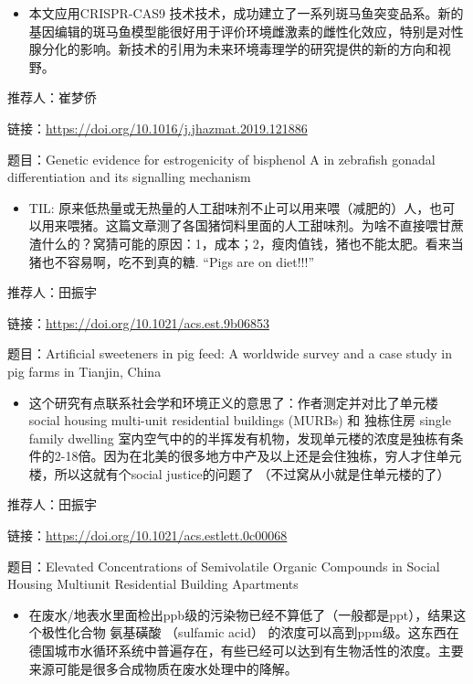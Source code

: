 \documentclass[]{book}
\providecommand{\tightlist}{%
  \setlength{\itemsep}{0pt}\setlength{\parskip}{0pt}}
\begin{document}
\begin{itemize}
\tightlist
\item
  本文应用CRISPR-CAS9 技术技术，成功建立了一系列斑马鱼突变品系。新的基因编辑的斑马鱼模型能很好用于评价环境雌激素的雌性化效应，特别是对性腺分化的影响。新技术的引用为未来环境毒理学的研究提供的新的方向和视野。
\end{itemize}

推荐人：崔梦侨

链接：\url{https://doi.org/10.1016/j.jhazmat.2019.121886}

题目：Genetic evidence for estrogenicity of bisphenol A in zebrafish gonadal differentiation and its signalling mechanism

\begin{itemize}
\tightlist
\item
  TIL: 原来低热量或无热量的人工甜味剂不止可以用来喂（减肥的）人，也可以用来喂猪。这篇文章测了各国猪饲料里面的人工甜味剂。为啥不直接喂甘蔗渣什么的？窝猜可能的原因：1，成本；2，瘦肉值钱，猪也不能太肥。看来当猪也不容易啊，吃不到真的糖. ``Pigs are on diet!!!''
\end{itemize}

推荐人：田振宇

链接：\url{https://doi.org/10.1021/acs.est.9b06853}

题目：Artificial sweeteners in pig feed: A worldwide survey and a case study in pig farms in Tianjin, China

\begin{itemize}
\tightlist
\item
  这个研究有点联系社会学和环境正义的意思了：作者测定并对比了单元楼 social housing multi-unit residential buildings (MURBs) 和 独栋住房 single family dwelling 室内空气中的的半挥发有机物，发现单元楼的浓度是独栋有条件的2-18倍。因为在北美的很多地方中产及以上还是会住独栋，穷人才住单元楼，所以这就有个social justice的问题了 （不过窝从小就是住单元楼的了）
\end{itemize}

推荐人：田振宇

链接：\url{https://doi.org/10.1021/acs.estlett.0c00068}

题目：Elevated Concentrations of Semivolatile Organic Compounds in Social Housing Multiunit Residential Building Apartments

\begin{itemize}
\tightlist
\item
  在废水/地表水里面检出ppb级的污染物已经不算低了（一般都是ppt），结果这个极性化合物 氨基磺酸 （sulfamic acid） 的浓度可以高到ppm级。这东西在德国城市水循环系统中普遍存在，有些已经可以达到有生物活性的浓度。主要来源可能是很多合成物质在废水处理中的降解。
\end{itemize}
\end{document}
